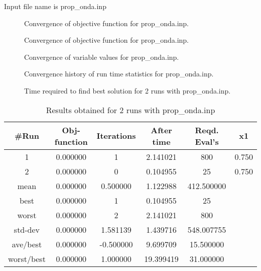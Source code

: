 \documentclass{article}
\begin{document}
 
Input file name is   prop_onda.inp

\begin{figure}[!htp]
 \centering {} 
 \caption{Convergence of objective function for prop_onda.inp.} \label{conv-ofn} \end{figure}
  \begin{figure}[!htp]
 \centering {} 
 \caption{Convergence of objective function for prop_onda.inp.} \label{conv-ofn} \end{figure}
\begin{figure}[!htp]
 \centering {} 
 \caption{Convergence of variable values for prop_onda.inp.} \label{conv-var} \end{figure}
\begin{figure}[!htp]
 \centering {} 
 \caption{Convergence history of run time statistics for prop_onda.inp.} \label{conv-run} \end{figure}
\begin{figure}[!htp]
 \centering {} 
 \caption{Time required to find best solution for 2 runs with  prop_onda.inp.} \label{time} \end{figure}
\begin{table}[!hp] \label{allresults}
  \begin{center}
 \caption{Results obtained for  2 runs with prop_onda.inp }
 \begin{tabular}{||c||c||c||c||c||c||} \hline \hline 
          \#Run&   Obj-function&     Iterations&     After time&   Reqd. Eval's&             x1\\ \hline \hline
              1&       0.000000&1&       2.141021&800&          0.750\\ \hline 
              2&       0.000000&0&       0.104955&25&          0.750\\ \hline 
           mean&       0.000000&       0.500000&       1.122988&     412.500000&\\ \hline 
           best&       0.000000&1&       0.104955&25&\\ \hline 
          worst&       0.000000&2&       2.141021&800&\\ \hline 
        std-dev&       0.000000&       1.581139&       1.439716&     548.007755&\\ \hline 
       ave/best&       0.000000&      -0.500000&       9.699709&      15.500000&\\ \hline 
     worst/best&       0.000000&       1.000000&      19.399419&      31.000000&\\ \hline 
\hline 
 \end{tabular}
 \end{center}
 \end{table}
\end{document}
